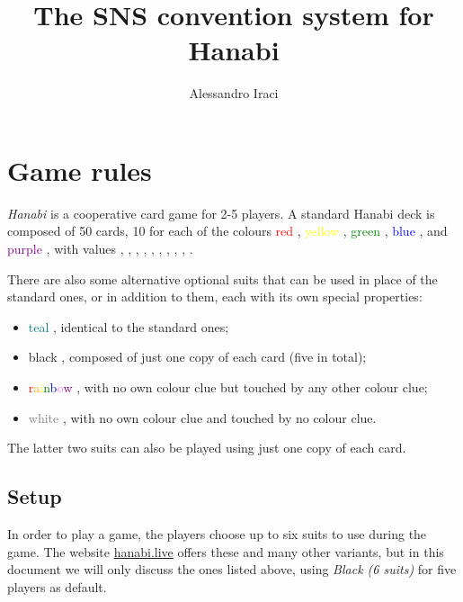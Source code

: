 \documentclass[a4paper]{article}
\title{The SNS convention system for Hanabi}
\author{Alessandro Iraci}
\theoremstyle{plain}
\theoremstyle{definition}
\begin{document}
	
\maketitle
\tableofcontents


\section{Game rules}

\emph{Hanabi} is a cooperative card game for 2-5 players. A standard Hanabi deck is composed of 50 cards, 10 for each of the colours \textcolor{red}{red} \red, \textcolor{yellow}{yellow} \yellow, \textcolor{green}{green} \green, \textcolor{blue}{blue} \blue, and \textcolor{purple}{purple} \purple, with values \one, \one, \one, \two, \two, \three, \three, \four, \four, \five.

There are also some alternative optional suits that can be used in place of the standard ones, or in addition to them, each with its own special properties:

\begin{itemize}
	\item \textcolor{teal}{teal} \teal, identical to the standard ones;
	\item black \black, composed of just one copy of each card (five in total);
	\item \textcolor{red}{r}\textcolor{orange}{a}\textcolor{yellow}{i}\textcolor{green}{n}\textcolor{blue}{b}\textcolor{violet}{o}\textcolor{purple}{w} \rainbow, with no own colour clue but touched by any other colour clue;
	\item \textcolor{gray}{white} \white, with no own colour clue and touched by no colour clue.
\end{itemize}

The latter two suits can also be played using just one copy of each card.


\subsection{Setup}

In order to play a game, the players choose up to six suits to use during the game. The website \href{http:/hanabi.live}{hanabi.live} offers these and many other variants, but in this document we will only discuss the ones listed above,  using \emph{Black (6 suits)} for five players as default.
\end{document}
